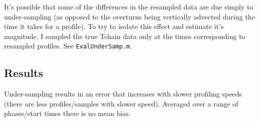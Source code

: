 \documentclass[11pt]{article}
\begin{document}
It's possible that some of the differences in the resampled data are due simply to under-sampling (as opposed to the overturns being vertically advected during the time it takes for a profile). To try to isolate this effect and estimate it's magnitude, I sampled the true Tchain data only at the times corresponding to resampled profiles. See \verb+EvalUnderSamp.m+.

\subsection{Results}
Under-sampling results in an error that increases with slower profiling speeds (there are less profiles/samples with slower speed). Averaged over a range of phases/start times there is no mean bias.

%
%
\end{document}
